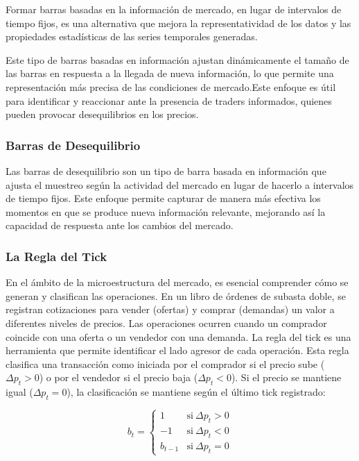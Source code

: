 \documentclass[a4paper,12pt, twoside]{report}
\begin{document}
Formar barras basadas en la información de mercado, en lugar de intervalos de tiempo fijos, 
es una alternativa que mejora la representatividad de los datos y las propiedades estadísticas 
de las series temporales generadas. 

Este tipo de barras basadas en información ajustan dinámicamente el tamaño de las barras
en respuesta a la llegada de nueva información, lo que permite una representación
más precisa de las condiciones de mercado.Este enfoque es útil para identificar y reaccionar 
ante la presencia de traders
informados, quienes pueden provocar desequilibrios en los precios.

\subsubsection{Barras de Desequilibrio}

Las barras de desequilibrio son un tipo de barra basada en información que ajusta el muestreo 
según la actividad del mercado en lugar de hacerlo a intervalos de tiempo fijos. Este enfoque 
permite capturar de manera más efectiva los momentos en que se produce nueva información relevante, 
mejorando así la capacidad de respuesta ante los cambios del mercado.

\subsubsection{La Regla del Tick}

En el ámbito de la microestructura del mercado, es esencial comprender cómo se generan y clasifican las operaciones. En un 
libro de órdenes de subasta doble, se registran cotizaciones para vender (ofertas) y comprar (demandas) un valor a diferentes 
niveles de precios. Las operaciones ocurren cuando un comprador coincide con una oferta o un vendedor con una demanda. La regla 
del tick es una herramienta que permite identificar el lado agresor de cada operación. Esta regla clasifica una transacción 
como iniciada por el comprador si el precio sube (\(\Delta p_t > 0\)) o por el vendedor si el precio baja (\(\Delta p_t < 0\)). 
Si el precio se mantiene igual (\(\Delta p_t = 0\)), la clasificación se mantiene según el último tick registrado:

\begin{equation}
b_t =
\begin{cases}
1 & \text{si} \ \Delta p_t > 0 \\
-1 & \text{si} \ \Delta p_t < 0 \\
b_{t-1} & \text{si} \ \Delta p_t = 0
\end{cases}
\end{equation}
\end{document}
